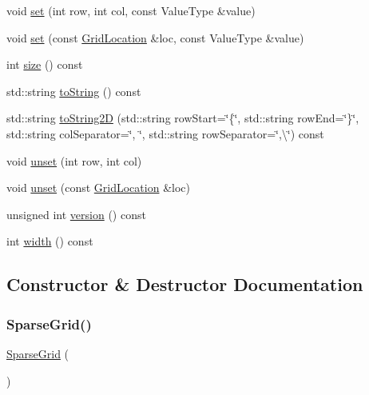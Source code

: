 \begin{DoxyCompactItemize}
\item 
void \mbox{\hyperlink{classSparseGrid_a6f5cee26d171f36d280a15c51332efc2}{set}} (int row, int col, const Value\+Type \&value)
\item 
void \mbox{\hyperlink{classSparseGrid_a02a61287a9aee6a1ff7e8a8325ce094d}{set}} (const \mbox{\hyperlink{structGridLocation}{Grid\+Location}} \&loc, const Value\+Type \&value)
\item 
int \mbox{\hyperlink{classSparseGrid_af9593d4a5ff4274efaf429cb4f9e57cc}{size}} () const
\item 
std\+::string \mbox{\hyperlink{classSparseGrid_a1fe5121d6528fdea3f243321b3fa3a49}{to\+String}} () const
\item 
std\+::string \mbox{\hyperlink{classSparseGrid_a8e636ad8b56218c7e0162d6c1bd78b39}{to\+String2D}} (std\+::string row\+Start=\char`\"{}\{\char`\"{}, std\+::string row\+End=\char`\"{}\}\char`\"{}, std\+::string col\+Separator=\char`\"{}, \char`\"{}, std\+::string row\+Separator=\char`\"{},\textbackslash{}\char`\"{}) const
\item 
void \mbox{\hyperlink{classSparseGrid_ae8cd7ce6866d5bccb4d900047b00a9f0}{unset}} (int row, int col)
\item 
void \mbox{\hyperlink{classSparseGrid_a6c6a0cedc17fead9553340c164db6eb3}{unset}} (const \mbox{\hyperlink{structGridLocation}{Grid\+Location}} \&loc)
\item 
unsigned int \mbox{\hyperlink{classSparseGrid_a0aa696ccb72cbf928535d6b646bac1aa}{version}} () const
\item 
int \mbox{\hyperlink{classSparseGrid_ad72663daf610f2a0833a2fc3d78e4fdf}{width}} () const
\end{DoxyCompactItemize}


\subsection{Constructor \& Destructor Documentation}
\mbox{\label{classSparseGrid_aa3e62bd1aaaaaa299dd7679cf577c1bd}} 
\subsubsection{\texorpdfstring{Sparse\+Grid()}{SparseGrid()}\hspace{0.1cm}{\footnotesize\ttfamily [1/5]}}
{\footnotesize\ttfamily \mbox{\hyperlink{classSparseGrid}{Sparse\+Grid}} (\begin{DoxyParamCaption}{ }\end{DoxyParamCaption})}

